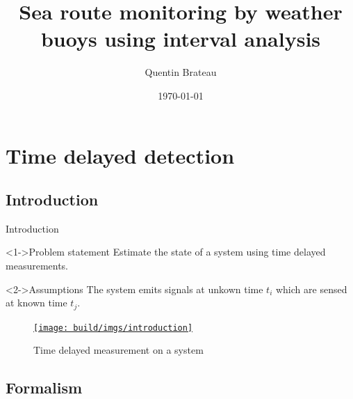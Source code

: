 \documentclass{beamer}
\title{Sea route monitoring by weather buoys using interval analysis}
\date{\today}
\author{Quentin Brateau}
\institute{ENSTA Bretagne}
\begin{document}
    \maketitle
    
    \section{Time delayed detection}

        \subsection{Introduction}

            \begin{frame}{Introduction}
                \begin{minipage}{0.45\textwidth}
                    \begin{block}<1->{Problem statement}
                        Estimate the state of a system using time delayed measurements.
                    \end{block}
                    \begin{block}<2->{Assumptions}
                        The system emits signals at unkown time $t_i$ which are sensed at known time $t_j$.
                    \end{block}
                \end{minipage}
                \hfill
                \begin{minipage}{0.5\textwidth}
                    \begin{overprint}
                            \begin{figure}
                                \href{run:introduction.mp4?autostart&loop}{\texttt{[image: build/imgs/introduction]}}
                                \caption{Time delayed measurement on a system}
                            \end{figure}
                    \end{overprint}
                \end{minipage}
            \end{frame}

        \subsection{Formalism}
\end{document}
